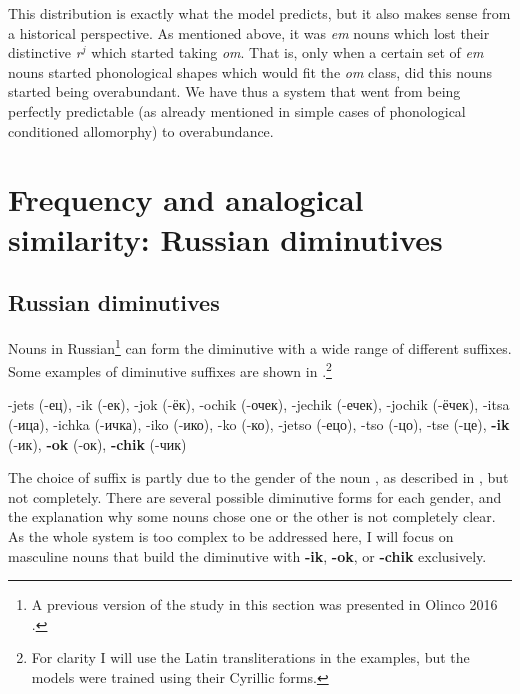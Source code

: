 \largerpage
This distribution is exactly what the model predicts, but it also makes sense from a historical perspective. As mentioned above, it was \textit{em} nouns which lost their distinctive \textit{r}$^j$ which started taking \textit{om}. That is, only when a certain set of \textit{em} nouns started phonological shapes which would fit the \textit{om} class, did this nouns started being overabundant. We have thus a system that went from being perfectly predictable (as already mentioned in simple cases of phonological conditioned allomorphy) to overabundance.


\section{Frequency and analogical similarity: Russian diminutives}


\subsection{Russian diminutives}

Nouns in Russian\footnote{A previous version of the study in this section was presented in Olinco 2016 \autocite{GuzmanNaranjo.2016a}.} can form the diminutive with a wide range of different suffixes. Some examples of diminutive suffixes are shown in .\footnote{For clarity I will use the Latin transliterations in the examples, but the models were trained using their Cyrillic forms.}

\begin{exe}
    \ex \label{dims-russian} -jets (-ец), -ik (-ек),  -jok (-ёк), -ochik (-очек), -jechik (-ечек), -jochik (-ёчек), -itsa (-ица), -ichka (-ичка), -iko (-ико), -ko (-ко), -jetso (-ецо), -tso (-цо), -tse (-це),  \textbf{-ik} (-ик),  \textbf{-ok} (-ок),  \textbf{-chik} (-чик)
\end{exe}

The choice of suffix is partly due to the gender of the noun \autocites{Kempe.2001, Kempe.2003}, as described in , but not completely. There are several possible diminutive forms for each gender, and the explanation why some nouns chose one or the other is not completely clear. As the whole system is too complex to be addressed here, I will focus on masculine nouns that build the diminutive with \textbf{-ik}, \textbf{-ok}, or \textbf{-chik} exclusively.

